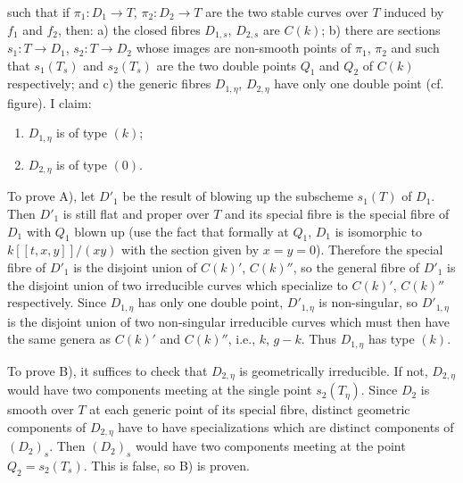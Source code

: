 \documentclass[10pt]{article}
\begin{document}
\begin{center}
\end{center}
such that if $\pi_1:D_1\to T$, $\pi_2:D_2\to T$ are the two stable curves over $T$ induced by $f_1$ and $f_2$, then: a) the closed fibres $D_{1,s}$, $D_{2,s}$ are $C(k)$; b) there are sections $s_1:T\to D_1$, $s_2:T\to D_2$ whose images are non-smooth points of $\pi_1$, $\pi_2$ and such that $s_1(T_s)$ and $s_2(T_s)$ are the two double points $Q_1$ and $Q_2$ of $C(k)$ respectively; and c) the generic fibres $D_{1,\eta}$, $D_{2,\eta}$ have only one double point (cf. figure). I claim:
\begin{enumerate}[label=\Alph*)]
\item $D_{1,\eta}$ is of type $(k)$;
\item $D_{2,\eta}$ is of type $(0)$.
\end{enumerate}

To prove A), let $D'_1$ be the result of blowing up the subscheme $s_1(T)$ of $D_1$. Then $D'_1$ is still flat and proper over $T$ and its special fibre is the special fibre of $D_1$ with $Q_1$ blown up (use the fact that formally at $Q_1$, $D_1$ is isomorphic to $k[[t,x,y]]/(xy)$ with the section given by $x=y=0$). Therefore the special fibre of $D'_1$ is the disjoint union of $C(k)'$, $C(k)''$, so the general fibre of $D'_1$ is the disjoint union of two irreducible curves which specialize to $C(k)'$, $C(k)''$ respectively. Since $D_{1,\eta}$ has only one double point, $D'_{1,\eta}$ is non-singular, so $D'_{1,\eta}$ is the disjoint union of two non-singular irreducible curves which must then have the same genera as $C(k)'$ and $C(k)''$, i.e., $k$, $g-k$. Thus $D_{1,\eta}$ has type $(k)$.

To prove B), it suffices to check that $D_{2,\eta}$ is geometrically irreducible. If not, $D_{2,\eta}$ would have two components meeting at the single point $s_2(T_\eta)$. Since $D_2$ is smooth over $T$ at each generic point of its special fibre, distinct geometric components of $D_{2,\eta}$ have to have specializations which are distinct components of $(D_2)_s$. Then $(D_2)_s$ would have two components meeting at the point $Q_2=s_2(T_s)$. This is false, so B) is proven.
\end{document}

